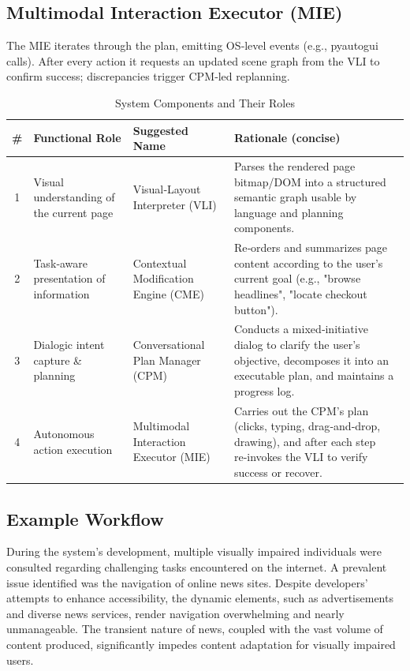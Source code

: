 \documentclass[conference]{IEEEtran}
\begin{document}
\subsection{Multimodal Interaction Executor (MIE)}

The MIE iterates through the plan, emitting OS‑level events (e.g., pyautogui calls). After every action it requests an updated scene graph from the VLI to confirm success; discrepancies trigger CPM‑led replanning.


\begin{table}[ht]
\centering
\caption{System Components and Their Roles}
\label{tab:architecture}
\small
\renewcommand{\arraystretch}{1.5}
\begin{tabular}{|c|p{1.6cm}|p{1.6cm}|p{4cm}|}
\hline
\textbf{\#} & \textbf{Functional Role} & \textbf{Suggested Name} & \textbf{Rationale (concise)} \\
\hline
1 & Visual understanding of the current page & Visual‑Layout Interpreter (VLI) & Parses the rendered page bitmap/DOM into a structured semantic graph usable by language and planning components. \\
\hline
2 & Task‑aware presentation of information & Contextual Modification Engine (CME) & Re‑orders and summarizes page content according to the user's current goal (e.g., "browse headlines", "locate checkout button"). \\
\hline
3 & Dialogic intent capture \& planning & Conversational Plan Manager (CPM) & Conducts a mixed‑initiative dialog to clarify the user's objective, decomposes it into an executable plan, and maintains a progress log. \\
\hline
4 & Autonomous action execution & Multimodal Interaction Executor (MIE) & Carries out the CPM's plan (clicks, typing, drag‑and‑drop, drawing), and after each step re‑invokes the VLI to verify success or recover. \\
\hline
\end{tabular}
\vspace{0.5cm}
\end{table}


\subsection*{Example Workflow}

During the system's development, multiple visually impaired individuals were consulted regarding challenging tasks encountered on the internet. A prevalent issue identified was the navigation of online news sites. Despite developers' attempts to enhance accessibility, the dynamic elements, such as advertisements and diverse news services, render navigation overwhelming and nearly unmanageable. The transient nature of news, coupled with the vast volume of content produced, significantly impedes content adaptation for visually impaired users. 
\end{document}
